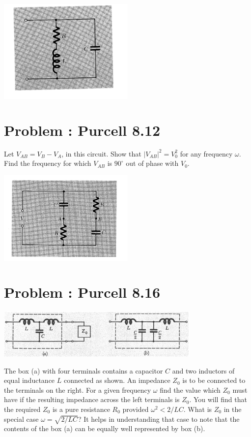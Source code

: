 \documentclass[problems]{esg8022pset}
\begin{document}
  \begin{center}
    \includegraphics[width = 0.5\textwidth]{figpu809}
  \end{center}
\section{Problem \thesection: Purcell 8.12}
  Let $V_{AB} = V_B - V_A$, in this circuit.  Show that $|V_{AB}|^2 =
  V_0^2$ for any frequency $\omega$.  Find the frequency for which $V_{AB}$
  is $90^\circ$ out of phase with $V_0$.

  \begin{center}
    \includegraphics[width = 0.5\textwidth]{figpu812}
  \end{center}
\section{Problem \thesection: Purcell 8.16}
  \begin{center}
    \includegraphics[width = 0.75\textwidth]{pu816}
  \end{center}

  \noindent The box (a) with four terminals contains a capacitor $C$ and
  two inductors of equal inductance $L$ connected as shown.  An impedance
  $Z_0$ is to be connected to the terminals on the right. For a given
  frequency $\omega$ find the value which $Z_0$ must have if the resulting
  impedance across the left terminals is $Z_0$. You will find that the
  required $Z_0$ is a pure resistance $R_0$ provided $\omega^2<2/LC$. What
  is $Z_0$ in the special case $\omega = \sqrt{2/LC}$?  It helps in
  understanding that case to note that the contents of the box (a) can be
  equally well represented by box (b).
\end{document}
